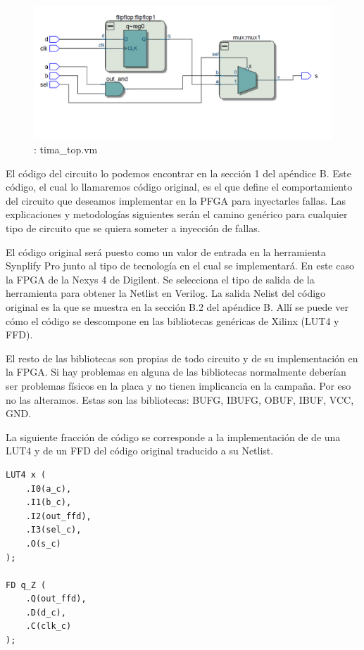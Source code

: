 \documentclass[a4paper,openright,12pt]{report}
\begin{document}
  \begin{figure}[H]
\centering
\includegraphics[width=160mm]{img/dut.png}
\caption{: tima\_top.vm \label{overflow}}
   \label{TIMA}
   \end{figure}
    
                
El código del circuito lo podemos encontrar en la sección 1 del apéndice B.
Este código, el cual lo llamaremos código original, es el que define el comportamiento del circuito que deseamos implementar en la PFGA para inyectarles fallas.
Las explicaciones y metodologías siguientes serán el camino genérico para cualquier tipo de circuito que se quiera someter a inyección de fallas.

El código original será puesto como un valor de entrada en la herramienta Synplify Pro junto al tipo de tecnología en el cual se implementará. En este caso la FPGA de la Nexys 4 de Digilent.
Se selecciona el tipo de salida de la herramienta para obtener  la Netlist en Verilog.
La salida Nelist del código original es la que se muestra en la sección B.2 del apéndice B. Allí se puede ver  cómo el código se descompone en las bibliotecas genéricas de Xilinx (LUT4 y FFD).

El resto de las bibliotecas son propias de todo circuito y de su implementación en la FPGA.
Si hay problemas en alguna de las bibliotecas normalmente deberían ser problemas físicos en la placa y no tienen  implicancia  en la campaña.
Por eso no las alteramos. Estas son las bibliotecas: BUFG, IBUFG, OBUF, IBUF, VCC, GND.

La siguiente fracción de código  se  corresponde a la implementación de de una LUT4 y de un FFD  del código original traducido a su Netlist.


\begin{lstlisting}
LUT4 x (
	.I0(a_c),
	.I1(b_c),
	.I2(out_ffd),
	.I3(sel_c),
	.O(s_c)
);

FD q_Z (
	.Q(out_ffd),
	.D(d_c),
	.C(clk_c)
);
		
\end{lstlisting}
	
\end{document}
